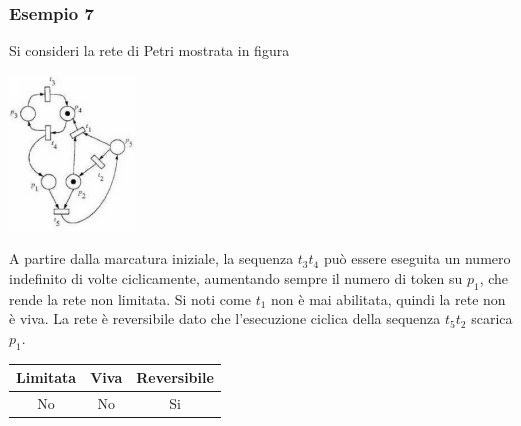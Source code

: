 \documentclass[10pt, letterpaper]{report}
\begin{document}
\subsubsection{Esempio 7}
Si consideri la rete di Petri mostrata in figura
\begin{center}
    \includegraphics[width=0.25\textwidth]{images/PetriEs7.png}
\end{center}
A partire dalla marcatura iniziale, la sequenza $t_3t_4$ può essere eseguita un numero indefinito di volte ciclicamente, aumentando sempre il numero di token su $p_1$, che rende la rete non limitata. Si noti come $t_1$ non è mai abilitata, quindi la rete non è viva. La rete è reversibile dato che l'esecuzione ciclica della sequenza $t_5t_2$ scarica $p_1$.
\begin{center}
    \begin{tabular}{|c|c|c|}
        \hline
        \rowcolor[HTML]{EFEFEF} 
        Limitata & Viva & Reversibile \\ \hline
        No       & No   & Si          \\ \hline
        \end{tabular}
\end{center}
\end{document}
